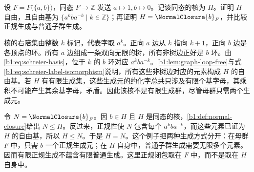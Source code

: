 \begin{optionalexercise}\label{b1:ex:08-infinite-rank-kernel}
	设 \(F=F\bigl(\{a,b\}\bigr)\)，同态 \(F\to\mathbb Z\) 发送 \(a\mapsto1,b\mapsto0\)。记该同态的核为 \(H\)。证明 \(H\) 自由，且自由基为 \(\{a^kba^{-k}\mid k\in\mathbb Z\}\)；再证明 \(H=\NormalClosure{b}_{F}\)，并比较正规生成与普通子群生成。
\end{optionalexercise}
\begin{solution}
	核的右陪集由整数 \(k\) 标记，代表字取 \(a^k\)。正向 \(a\) 边从 \(k\) 指向 \(k+1\)，正向 \(b\) 边是各顶点的环。所有 \(a\) 边组成一条双向无限的树，所有非树边正好是 \(b\) 环。由\eqref{b1:eq:schreier-basis}，位于 \(k\) 的 \(b\) 环对应 \(a^kba^{-k}\)。\cref{b1:lem:graph-loop-free}与式\eqref{b1:eq:schreier-label-isomorphism}说明，所有这些非树边对应的元素构成 \(H\) 的自由基。若 \(H\) 有有限生成集，这些生成元的约化字总共只涉及有限个基字母，其乘积不可能产生其余基字母，矛盾。因此该核不是有限生成群，尽管母群只需两个生成元。

	令 \(N=\NormalClosure{b}_{F}\)。因 \(b\in H\) 且 \(H\) 是同态的核，\cref{b1:def:normal-closure}给出 \(N\le H\)。反过来，正规性使 \(N\) 包含每个 \(a^kba^{-k}\)，而这些元素已证为 \(H\) 的自由基，所以 \(H\le N\)。于是 \(H=N\)。这个例子把两种生成方式分开：在母群 \(F\) 中，只需 \(b\) 一个正规生成元；在 \(H\) 自身中，普通子群生成需要无限多个元素。因而有限正规生成不蕴含有限普通生成。这里正规闭包取在 \(F\) 中，而不是取在 \(H\) 自身中。
\end{solution}

